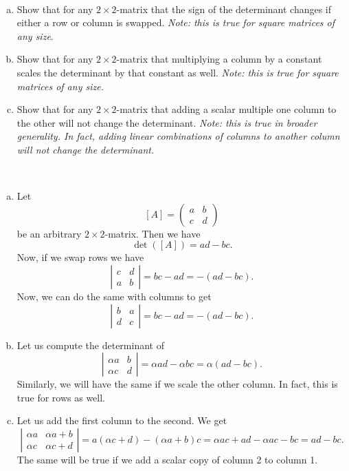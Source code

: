 \documentclass[12pt]{article} %
\begin{document}
\newpage
\begin{problem}~
\begin{enumerate}[(a)]
    \item Show that for any $2\times 2$-matrix that the sign of the determinant changes if either a row or column is swapped. \emph{Note: this is true for square matrices of any size}.
    \item Show that for any $2\times 2$-matrix that multiplying a column by a constant scales the determinant by that constant as well. \emph{Note: this is true for square matrices of any size.}
    \item Show that for any $2\times 2$-matrix that adding a scalar multiple one column to the other will not change the determinant. \emph{Note: this is true in broader generality. In fact, adding linear combinations of columns to another column will not change the determinant.}
\end{enumerate}
\end{problem}
\begin{solution}~
\begin{enumerate}[(a)]
    \item Let
    \[
    [A]=\begin{pmatrix} a & b \\ c & d \end{pmatrix}
    \]
    be an arbitrary $2\times 2$-matrix.  Then we have
    \[
    \det([A])=ad-bc.
    \]
    Now, if we swap rows we have
    \[
    \left| \begin{matrix} c & d \\ a & b \end{matrix} \right| = bc-ad = -(ad-bc).
    \]
    Now, we can do the same with columns to get
    \[
    \left| \begin{matrix} b & a \\ d & c \end{matrix} \right| = bc-ad = -(ad-bc).
    \]
    \item Let us compute the determinant of
    \[
    \left| \begin{matrix} \alpha a & b \\ \alpha c & d \end{matrix} \right| = \alpha ad - \alpha bc = \alpha(ad-bc).
    \]
    Similarly, we will have the same if we scale the other column. In fact, this is true for rows as well.
    \item Let us add the first column to the second. We get
    \[
     \left| \begin{matrix} \alpha a & \alpha a+b \\ \alpha c & \alpha c+d \end{matrix} \right| = a(\alpha c+d)-(\alpha a+b)c = \alpha ac+ad-\alpha ac-bc = ad-bc.
    \]
    The same will be true if we add a scalar copy of column 2 to column 1.
\end{enumerate}
\end{solution}
\end{document}
